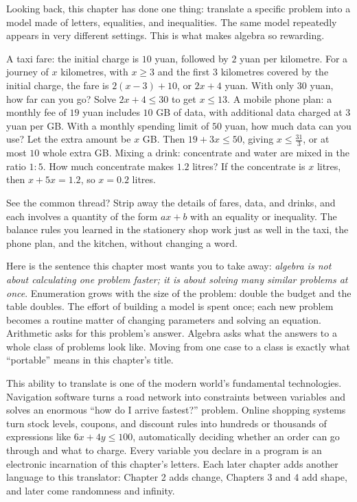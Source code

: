 Looking back, this chapter has done one thing: translate a specific problem into a model made of letters, equalities, and inequalities. The same model repeatedly appears in very different settings. This is what makes algebra so rewarding.

A taxi fare: the initial charge is $10$ yuan, followed by $2$ yuan per kilometre. For a journey of $x$ kilometres, with $x\geq3$ and the first $3$ kilometres covered by the initial charge, the fare is $2(x-3)+10$, or $2x+4$ yuan. With only $30$ yuan, how far can you go? Solve $2x+4\leq30$ to get $x\leq13$. A mobile phone plan: a monthly fee of $19$ yuan includes $10$ GB of data, with additional data charged at $3$ yuan per GB. With a monthly spending limit of $50$ yuan, how much data can you use? Let the extra amount be $x$ GB. Then $19+3x\leq50$, giving $x\leq\frac{31}{3}$, or at most $10$ whole extra GB. Mixing a drink: concentrate and water are mixed in the ratio $1:5$. How much concentrate makes $1.2$ litres? If the concentrate is $x$ litres, then $x+5x=1.2$, so $x=0.2$ litres.

See the common thread? Strip away the details of fares, data, and drinks, and each involves a quantity of the form $ax+b$ with an equality or inequality. The balance rules you learned in the stationery shop work just as well in the taxi, the phone plan, and the kitchen, without changing a word.

Here is the sentence this chapter most wants you to take away: \emph{algebra is not about calculating one problem faster; it is about solving many similar problems at once}. Enumeration grows with the size of the problem: double the budget and the table doubles. The effort of building a model is spent once; each new problem becomes a routine matter of changing parameters and solving an equation. Arithmetic asks for this problem's answer. Algebra asks what the answers to a whole class of problems look like. Moving from one case to a class is exactly what ``portable'' means in this chapter's title.

\begin{lianjie}
This ability to translate is one of the modern world's fundamental technologies. Navigation software turns a road network into constraints between variables and solves an enormous ``how do I arrive fastest?'' problem. Online shopping systems turn stock levels, coupons, and discount rules into hundreds or thousands of expressions like $6x+4y\leq100$, automatically deciding whether an order can go through and what to charge. Every variable you declare in a program is an electronic incarnation of this chapter's letters. Each later chapter adds another language to this translator: Chapter 2 adds change, Chapters 3 and 4 add shape, and later come randomness and infinity.
\end{lianjie}

